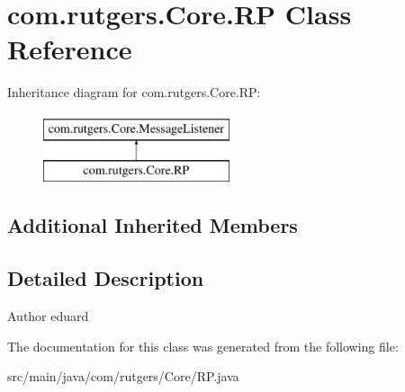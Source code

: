 \hypertarget{classcom_1_1rutgers_1_1Core_1_1RP}{}\section{com.\+rutgers.\+Core.\+RP Class Reference}
\label{classcom_1_1rutgers_1_1Core_1_1RP}
Inheritance diagram for com.\+rutgers.\+Core.\+RP\+:\begin{figure}[H]
\begin{center}
\leavevmode
\includegraphics[height=2.000000cm]{classcom_1_1rutgers_1_1Core_1_1RP}
\end{center}
\end{figure}
\subsection*{Additional Inherited Members}


\subsection{Detailed Description}
\begin{DoxyAuthor}{Author}
eduard 
\end{DoxyAuthor}


The documentation for this class was generated from the following file\+:\begin{DoxyCompactItemize}
\item 
src/main/java/com/rutgers/\+Core/R\+P.\+java\end{DoxyCompactItemize}
